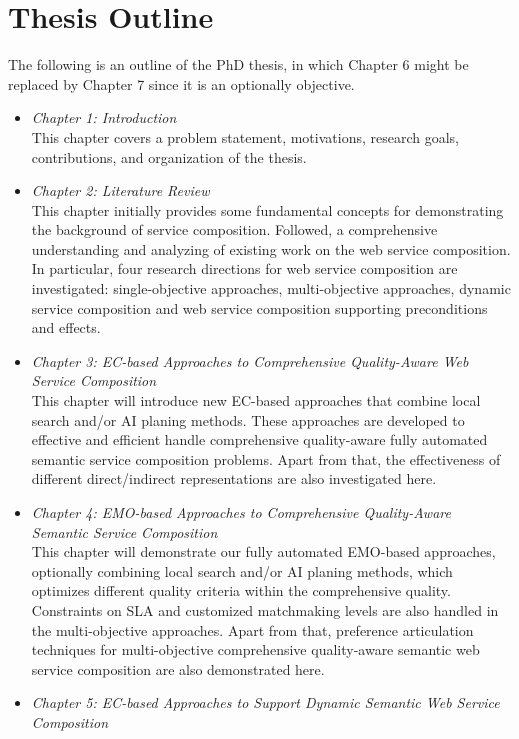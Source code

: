 \section{Thesis Outline}

The following is an outline of the PhD thesis,  in which Chapter 6 might be replaced by Chapter 7 since it is an optionally objective.

\begin{itemize}
 \item \textit{Chapter 1: Introduction}\\
 This chapter covers a problem statement, motivations, research goals, contributions, and organization of the thesis.
 \item \textit{Chapter 2: Literature Review}\\
This chapter initially provides some fundamental concepts for demonstrating the background of service composition. Followed, a comprehensive understanding and analyzing of existing work on the web service composition.  In particular, four research directions for web service composition are investigated: single-objective approaches, multi-objective approaches, dynamic service composition and web service composition supporting preconditions and effects.
 \item \textit{Chapter 3: EC-based Approaches to Comprehensive Quality-Aware Web Service Composition}\\
This chapter will introduce new EC-based approaches that combine local search and/or AI planing methods. These approaches are developed to effective and efficient handle comprehensive quality-aware fully automated semantic service composition problems. Apart from that, the effectiveness of different direct/indirect representations are also investigated here.
 \item \textit{Chapter 4: EMO-based Approaches to Comprehensive Quality-Aware Semantic Service Composition}\\
This chapter will demonstrate our fully automated EMO-based approaches, optionally combining local search and/or AI planing methods, which optimizes different quality criteria within the comprehensive quality. Constraints on SLA and customized matchmaking levels are also handled in the multi-objective approaches. Apart from that, preference articulation techniques for multi-objective comprehensive quality-aware semantic web service composition are also demonstrated here.
 \item \textit{Chapter 5: EC-based Approaches to Support Dynamic Semantic Web Service Composition}\\

\end{itemize}
